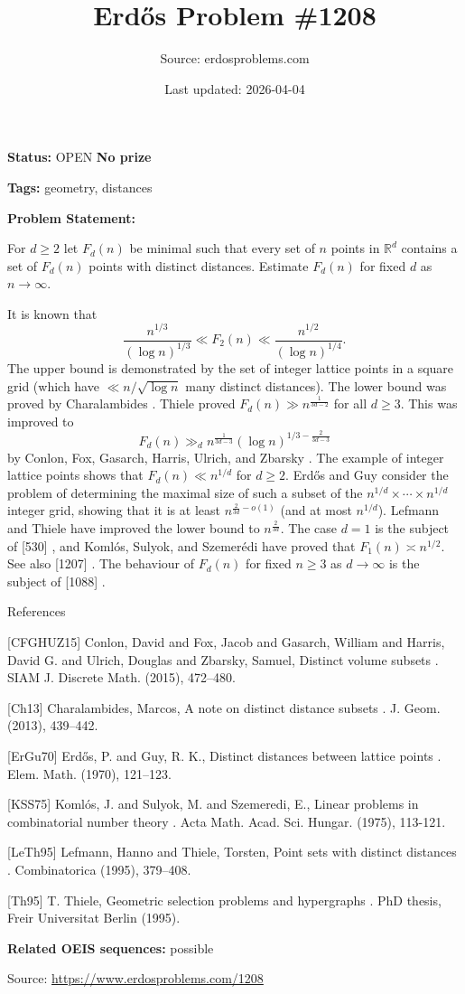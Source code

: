 \documentclass{article}
\title{Erd\H{o}s Problem \#1208}
\date{Last updated: 2026-04-04}
\author{Source: erdosproblems.com}
\begin{document}
\maketitle

\noindent\textbf{Status:} OPEN \quad \textbf{No prize}

\noindent\textbf{Tags:} geometry, distances

\medskip

\noindent\textbf{Problem Statement:}

For $d\geq 2$ let $F_d(n)$ be minimal such that every set of $n$ points in $\mathbb{R}^d$ contains a set of $F_d(n)$ points with distinct distances. Estimate $F_d(n)$ for fixed $d$ as $n\to \infty$.




It is known that\[\frac{n^{1/3}}{(\log n)^{1/3}}\ll F_2(n) \ll \frac{n^{1/2}}{(\log n)^{1/4}}.\]The upper bound is demonstrated by the set of integer lattice points in a square grid (which have $\ll n/\sqrt{\log n}$ many distinct distances). The lower bound was proved by Charalambides \cite{Ch13}. Thiele \cite{Th95} proved $F_d(n) \gg n^{\frac{1}{3d-2}}$ for all $d\geq 3$. This was improved to\[F_d(n) \gg_d n^{\frac{1}{3d-3}}(\log n)^{1/3-\frac{2}{3d-3}}\]by Conlon, Fox, Gasarch, Harris, Ulrich, and Zbarsky \cite{CFGHUZ15}. The example of integer lattice points shows that $F_d(n)\ll n^{1/d}$ for $d\geq 2$. Erd\H{o}s and Guy \cite{ErGu70} consider the problem of determining the maximal size of such a subset of the $n^{1/d}\times\cdots \times n^{1/d}$ integer grid, showing that it is at least $n^{\frac{2}{3d}-o(1)}$ (and at most $n^{1/d}$). Lefmann and Thiele \cite{LeTh95} have improved the lower bound to $n^{\frac{2}{3d}}$. The case $d=1$ is the subject of [530] , and Koml\'{o}s, Sulyok, and Szemer\'{e}di \cite{KSS75} have proved that $F_1(n)\asymp n^{1/2}$. See also [1207] . The behaviour of $F_d(n)$ for fixed $n\geq 3$ as $d\to \infty$ is the subject of [1088] .




References

[CFGHUZ15] Conlon, David and Fox, Jacob and Gasarch, William and Harris, David G. and Ulrich, Douglas and Zbarsky, Samuel, Distinct volume subsets . SIAM J. Discrete Math. (2015), 472--480.

[Ch13] Charalambides, Marcos, A note on distinct distance subsets . J. Geom. (2013), 439--442.

[ErGu70] Erd\H{o}s, P. and Guy, R. K., Distinct distances between lattice points . Elem. Math. (1970), 121--123.

[KSS75] Koml\'{o}s, J. and Sulyok, M. and Szemeredi, E., Linear problems in combinatorial number theory . Acta Math. Acad. Sci. Hungar. (1975), 113-121.

[LeTh95] Lefmann, Hanno and Thiele, Torsten, Point sets with distinct distances . Combinatorica (1995), 379--408.

[Th95] T. Thiele, Geometric selection problems and hypergraphs . PhD thesis, Freir Universitat Berlin (1995).

\noindent\textbf{Related OEIS sequences:} possible


\bigskip
\noindent\small{Source: \url{https://www.erdosproblems.com/1208}}
\end{document}
